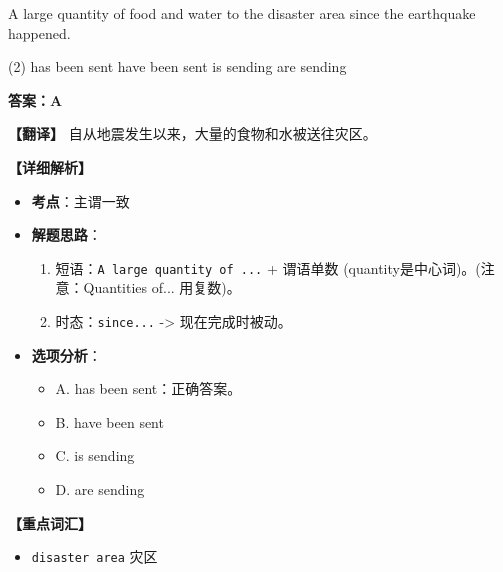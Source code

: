 \documentclass[11pt, a4paper]{article}
\newcommand{\analysis}[4]{
    \begin{solutionbox}
        \textbf{答案：#1}
        
        \textbf{【翻译】} #2
        
        \textbf{【详细解析】}
        #3
        
        \textbf{【重点词汇】}
        #4
    \end{solutionbox}
}
\newcommand{\blank}{\underline{\hspace{1.5cm}}}
\begin{document}
\begin{questions}
    \item A large quantity of food and water \blank to the disaster area since the earthquake happened.
    \begin{tasks}(2)
        \task has been sent \task have been sent
        \task is sending \task are sending
    \end{tasks}
    \analysis{A}{自从地震发生以来，大量的食物和水被送往灾区。}{
        \begin{itemize}
            \item \textbf{考点}：主谓一致
            \item \textbf{解题思路}：
                \begin{enumerate}
                    \item 短语：\texttt{A large quantity of ...} + 谓语单数 (quantity是中心词)。(注意：Quantities of... 用复数)。
                    \item 时态：\texttt{since...} -> 现在完成时被动。
                \end{enumerate}
            \item \textbf{选项分析}：
                \begin{itemize}
                    \item A. has been sent：正确答案。
                    \item B. have been sent
                    \item C. is sending
                    \item D. are sending
                \end{itemize}
        \end{itemize}
    }{
        \begin{itemize}
            \item \texttt{disaster area} 灾区
        \end{itemize}
    }


\end{questions}
\end{document}
